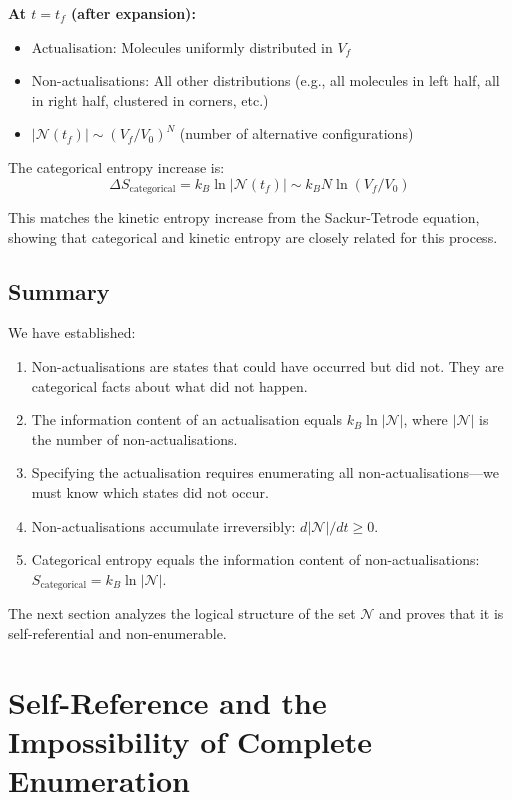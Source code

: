 \documentclass[twocolumn,10pt]{article}
\theoremstyle{definition}
\theoremstyle{remark}
\begin{document}
\textbf{At $t = t_f$ (after expansion):}
\begin{itemize}
\item Actualisation: Molecules uniformly distributed in $V_f$
\item Non-actualisations: All other distributions (e.g., all molecules in left half, all in right half, clustered in corners, etc.)
\item $|\mathcal{N}(t_f)| \sim (V_f / V_0)^N$ (number of alternative configurations)
\end{itemize}

The categorical entropy increase is:
$$
\Delta S_{\text{categorical}} = k_B \ln |\mathcal{N}(t_f)| \sim k_B N \ln(V_f / V_0)
$$

This matches the kinetic entropy increase from the Sackur-Tetrode equation, showing that categorical and kinetic entropy are closely related for this process.

\subsection{Summary}

We have established:

\begin{enumerate}
\item Non-actualisations are states that could have occurred but did not. They are categorical facts about what did not happen.

\item The information content of an actualisation equals $k_B \ln |\mathcal{N}|$, where $|\mathcal{N}|$ is the number of non-actualisations.

\item Specifying the actualisation requires enumerating all non-actualisations—we must know which states did not occur.

\item Non-actualisations accumulate irreversibly: $d|\mathcal{N}|/dt \geq 0$.

\item Categorical entropy equals the information content of non-actualisations: $S_{\text{categorical}} = k_B \ln |\mathcal{N}|$.
\end{enumerate}

The next section analyzes the logical structure of the set $\mathcal{N}$ and proves that it is self-referential and non-enumerable.


\section{Self-Reference and the Impossibility of Complete Enumeration}
\label{sec:self-reference}
\end{document}
